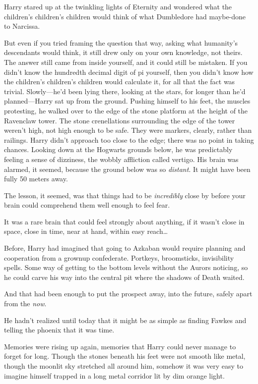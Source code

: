Harry stared up at the twinkling lights of Eternity and wondered what the
children's children's children would think of what Dumbledore had maybe-done to
Narcissa.

But even if you tried framing the question that way, asking what humanity's
descendants would think, it still drew only on your own knowledge, not theirs.
The answer still came from inside yourself, and it could still be mistaken. If
you didn't know the hundredth decimal digit of pi yourself, then you didn't
know how the children's children's children would calculate it, for all that
the fact was trivial.
\sbreak
Slowly---he'd been lying there, looking at the stars, for longer than he'd
planned---Harry sat up from the ground. Pushing himself to his feet, the
muscles protesting, he walked over to the edge of the stone platform at the
height of the Ravenclaw tower. The stone crenellations surrounding the edge of
the tower weren't high, not high enough to be safe. They were markers, clearly,
rather than railings. Harry didn't approach too close to the edge; there was no
point in taking chances. Looking down at the Hogwarts grounds below, he was
predictably feeling a sense of dizziness, the wobbly affliction called vertigo.
His brain was alarmed, it seemed, because the ground below was so
\emph{distant}. It might have been fully 50 meters away.

The lesson, it seemed, was that things had to be \emph{incredibly} close by
before your brain could comprehend them well enough to feel fear.

It was a rare brain that could feel strongly about anything, if it wasn't close
in space, close in time, near at hand, within easy reach{\ldots}

Before, Harry had imagined that going to Azkaban would require planning and
cooperation from a grownup confederate. Portkeys, broomsticks, invisibility
spells. Some way of getting to the bottom levels without the Aurors noticing,
so he could carve his way into the central pit where the shadows of Death
waited.

And that had been enough to put the prospect away, into the future, safely
apart from the \emph{now}.

He hadn't realized until today that it might be as simple as finding Fawkes and
telling the phoenix that it was time.

Memories were rising up again, memories that Harry could never manage to forget
for long. Though the stones beneath his feet were not smooth like metal, though
the moonlit sky stretched all around him, somehow it was very easy to imagine
himself trapped in a long metal corridor lit by dim orange light.

